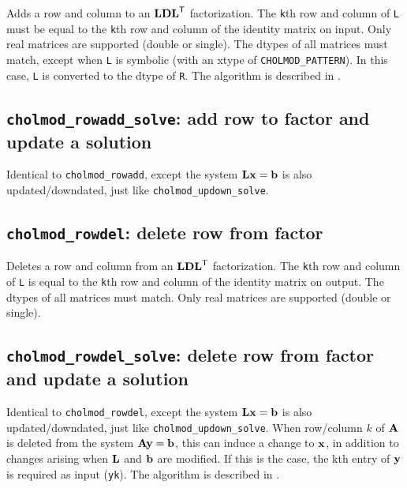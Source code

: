 \documentclass[11pt]{article}
\newcommand{\m}[1]{{\bf{#1}}}       %
\newcommand{\tr}{^{\sf T}}          %
\begin{document}

Adds a row and column to an $\m{LDL}\tr$ factorization.  The {\tt k}th row and
column of {\tt L} must be equal to the {\tt k}th row and column of the identity
matrix on input.  Only real matrices are supported (double or single).  The
dtypes of all matrices must match, except when \verb'L' is symbolic (with an
xtype of \verb'CHOLMOD_PATTERN').  In this case, \verb'L' is converted to the
dtype of \verb'R'.  The algorithm is described in \cite{DavisHager05}.

\subsection{{\tt cholmod\_rowadd\_solve}: add row to factor and update a
solution}


Identical to {\tt cholmod\_rowadd}, except the system $\m{Lx}=\m{b}$ is also
updated/downdated, just like {\tt cholmod\_updown\_solve}.

\subsection{{\tt cholmod\_rowdel}: delete row from factor}


Deletes a row and column from an $\m{LDL}\tr$ factorization.  The {\tt k}th row
and column of {\tt L} is equal to the {\tt k}th row and column of the identity
matrix on output.  The dtypes of all matrices must match.  Only real matrices
are supported (double or single).

\subsection{{\tt cholmod\_rowdel\_solve}: delete row from factor and update a solution}


Identical to {\tt cholmod\_rowdel}, except the system $\m{Lx}=\m{b}$ is also
updated/downdated, just like {\tt cholmod\_updown\_solve}.  When row/column $k$
of $\m{A}$ is deleted from the system $\m{Ay}=\m{b}$, this can induce a change
to $\m{x}$, in addition to changes arising when $\m{L}$ and $\m{b}$ are
modified.  If this is the case, the kth entry of $\m{y}$ is required as input
({\tt yk}).  The algorithm is described in \cite{DavisHager05}.
\end{document}
